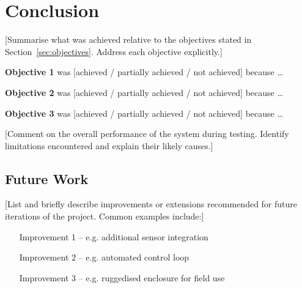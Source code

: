 \chapter{Conclusion}
\label{ch:conclusion}

[Summarise what was achieved relative to the objectives stated in
Section~\ref{sec:objectives}. Address each objective explicitly.]

\textbf{Objective 1} was [achieved / partially achieved / not achieved]
because \ldots

\textbf{Objective 2} was [achieved / partially achieved / not achieved]
because \ldots

\textbf{Objective 3} was [achieved / partially achieved / not achieved]
because \ldots

[Comment on the overall performance of the system during testing.
Identify limitations encountered and explain their likely causes.]

\section*{Future Work}

[List and briefly describe improvements or extensions recommended
for future iterations of the project. Common examples include:]

\begin{itemize}
    \item [Improvement 1 – e.g. additional sensor integration]
    \item [Improvement 2 – e.g. automated control loop]
    \item [Improvement 3 – e.g. ruggedised enclosure for field use]
\end{itemize}
